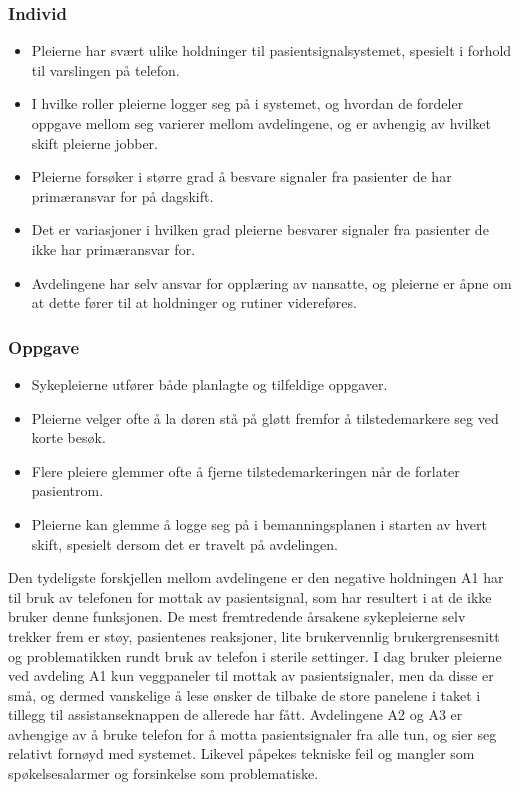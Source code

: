 \subsubsection{Individ}
\begin{itemize}
\item Pleierne har svært ulike holdninger til pasientsignalsystemet, spesielt i forhold til varslingen på telefon.

\item I hvilke roller pleierne logger seg på i systemet, og hvordan de fordeler oppgave mellom seg varierer mellom avdelingene, og er avhengig av hvilket skift pleierne jobber.

\item Pleierne forsøker i større grad å besvare signaler fra pasienter de har primæransvar for på dagskift.

\item Det er variasjoner i hvilken grad pleierne besvarer signaler fra pasienter de ikke har primæransvar for.

\item Avdelingene har selv ansvar for opplæring av nansatte, og pleierne er åpne om at dette fører til at holdninger og rutiner videreføres.

\end{itemize}

\subsubsection{Oppgave}
\begin{itemize}
\item Sykepleierne utfører både planlagte og tilfeldige oppgaver.

\item Pleierne velger ofte å la døren stå på gløtt fremfor å tilstedemarkere seg ved korte besøk. 

\item Flere pleiere glemmer ofte å fjerne tilstedemarkeringen når de forlater pasientrom.

\item Pleierne kan glemme å logge seg på i bemanningsplanen i starten av hvert skift, spesielt dersom det er travelt på avdelingen.

\end{itemize}

Den tydeligste forskjellen mellom avdelingene er den negative holdningen A1 har til bruk av telefonen for mottak av pasientsignal, som har resultert i at de ikke bruker denne funksjonen. De mest fremtredende årsakene sykepleierne selv trekker frem er støy, pasientenes reaksjoner, lite brukervennlig brukergrensesnitt og problematikken rundt bruk av telefon i sterile settinger. I dag bruker pleierne ved avdeling A1 kun veggpaneler til mottak av pasientsignaler, men da disse er små, og dermed vanskelige å lese ønsker de tilbake de store panelene i taket i tillegg til assistanseknappen de allerede har fått. Avdelingene A2 og A3 er avhengige av å bruke telefon for å motta pasientsignaler fra alle tun, og sier seg relativt fornøyd med systemet. Likevel påpekes tekniske feil og mangler som spøkelsesalarmer og forsinkelse som problematiske. 

